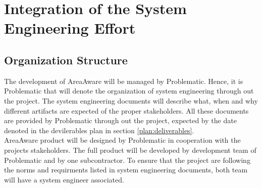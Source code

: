 %
\thispagestyle{fancy}
\chapter{Integration of the System Engineering Effort}
\label{chp:int_se_effort}

\section{Organization Structure}
The development of AreaAware will be managed by Problematic.
Hence, it is Problematic that will denote the organization of system engineering through out the project.
The system engineering documents will describe what, when and why different artifacts are expected of the proper stakeholders.
All these documents are provided by Problematic through out the project, expected by the date denoted in the devilerables plan in section \ref{plan:deliverables}.\\


\noindent AreaAware product will be designed by Problematic in cooperation with the projects stakeholders.
The full product will be developed by development team of Problematic and by one subcontractor.
To ensure that the project are following the norms and requirments listed in system engineering documents, both team will have a system engineer associated.
